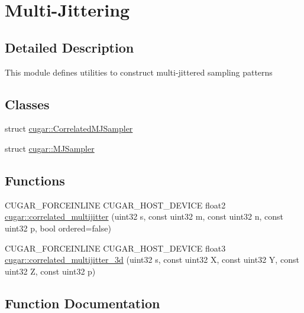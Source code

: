 \hypertarget{group__multijitter}{}\section{Multi-\/\+Jittering}
\label{group__multijitter}


\subsection{Detailed Description}
This module defines utilities to construct multi-\/jittered sampling patterns \subsection*{Classes}
\begin{DoxyCompactItemize}
\item 
struct \hyperlink{structcugar_1_1_correlated_m_j_sampler}{cugar\+::\+Correlated\+M\+J\+Sampler}
\item 
struct \hyperlink{structcugar_1_1_m_j_sampler}{cugar\+::\+M\+J\+Sampler}
\end{DoxyCompactItemize}
\subsection*{Functions}
\begin{DoxyCompactItemize}
\item 
C\+U\+G\+A\+R\+\_\+\+F\+O\+R\+C\+E\+I\+N\+L\+I\+NE C\+U\+G\+A\+R\+\_\+\+H\+O\+S\+T\+\_\+\+D\+E\+V\+I\+CE float2 \hyperlink{group__multijitter_gaf3f4e367e2cdfe133eae518f82cda8b6}{cugar\+::correlated\+\_\+multijitter} (uint32 s, const uint32 m, const uint32 n, const uint32 p, bool ordered=false)
\item 
C\+U\+G\+A\+R\+\_\+\+F\+O\+R\+C\+E\+I\+N\+L\+I\+NE C\+U\+G\+A\+R\+\_\+\+H\+O\+S\+T\+\_\+\+D\+E\+V\+I\+CE float3 \hyperlink{group__multijitter_ga23bdc35923e1dc33a8d0c35f671b5554}{cugar\+::correlated\+\_\+multijitter\+\_\+3d} (uint32 s, const uint32 X, const uint32 Y, const uint32 Z, const uint32 p)
\end{DoxyCompactItemize}


\subsection{Function Documentation}
\mbox{\label{group__multijitter_gaf3f4e367e2cdfe133eae518f82cda8b6}} 
